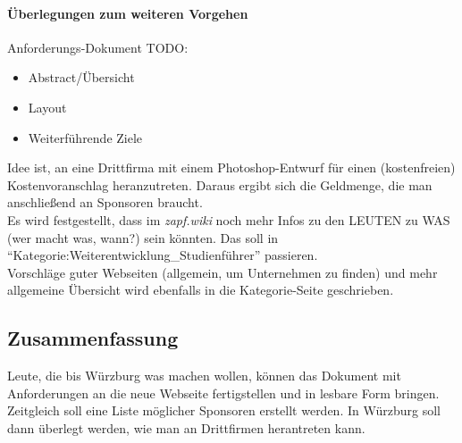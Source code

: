     \paragraph{Überlegungen zum weiteren Vorgehen}
      Anforderungs-Dokument TODO:
      \begin{itemize}
        \item Abstract/Übersicht
        \item Layout
        \item Weiterführende Ziele
      \end{itemize}

      Idee ist, an eine Drittfirma mit einem Photoshop-Entwurf für einen (kostenfreien) Kostenvoranschlag heranzutreten.
      Daraus ergibt sich die Geldmenge, die man anschließend an Sponsoren braucht. \\

      Es wird festgestellt, dass im \textit{zapf.wiki} noch mehr Infos zu den LEUTEN zu WAS (wer macht was, wann?) sein könnten. Das soll in ``Kategorie:Weiterentwicklung_Studienführer'' passieren. \\

      Vorschläge guter Webseiten (allgemein, um Unternehmen zu finden) und mehr allgemeine Übersicht wird ebenfalls in die Kategorie-Seite geschrieben.

  \subsection*{Zusammenfassung}
    Leute, die bis Würzburg was machen wollen, können das Dokument mit Anforderungen an die neue Webseite fertigstellen und in lesbare Form bringen.
    Zeitgleich soll eine Liste möglicher Sponsoren erstellt werden. In Würzburg soll dann überlegt werden, wie man an Drittfirmen herantreten kann.
